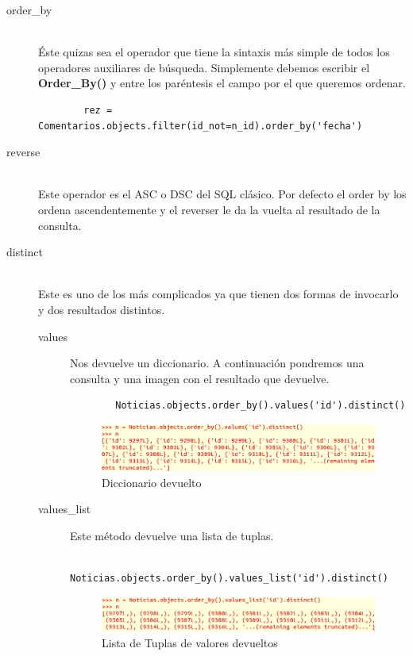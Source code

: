 \begin{description}
	\item[order\_by] \hfill \\
	 Éste quizas sea el operador que tiene la sintaxis más simple de todos los operadores auxiliares de búsqueda. Simplemente debemos escribir el \textbf{Order\_By()} y entre los paréntesis el campo por el que queremos ordenar. 
	\begin{lstlisting}
		rez = Comentarios.objects.filter(id_not=n_id).order_by('fecha')	
	\end{lstlisting}
	
	\item[reverse] \hfill \\
	 Este operador es el ASC o DSC del SQL clásico. Por defecto el order by los ordena ascendentemente y el reverser le da la vuelta al resultado de la consulta.
	 
	 \item[distinct]\hfill \\
	 Este es uno de los más complicados ya que tienen dos formas de invocarlo y dos resultados distintos.
	 \begin{description}
	  \item[values]
	  	Nos devuelve un diccionario. A continuación pondremos una consulta y una imagen con el resultado que devuelve.
	  \begin{lstlisting}
	 	Noticias.objects.order_by().values('id').distinct()  
	  \end{lstlisting}
	\begin{figure}[h]
	  \includegraphics[width=\textwidth]{./django/imagenes/values.png} 
	\caption{Diccionario devuelto}
	\end{figure}	   

	  \item[values\_list]
	  	Este método devuelve una lista de tuplas. 
	  \begin{lstlisting}
	 	Noticias.objects.order_by().values_list('id').distinct()  
	  \end{lstlisting}
	\begin{figure}[h]
	  \includegraphics[width=\textwidth]{./django/imagenes/values_list.png} 
	\caption{Lista de Tuplas de valores devueltos}
	\end{figure}	   


\end{description}
\end{description}
